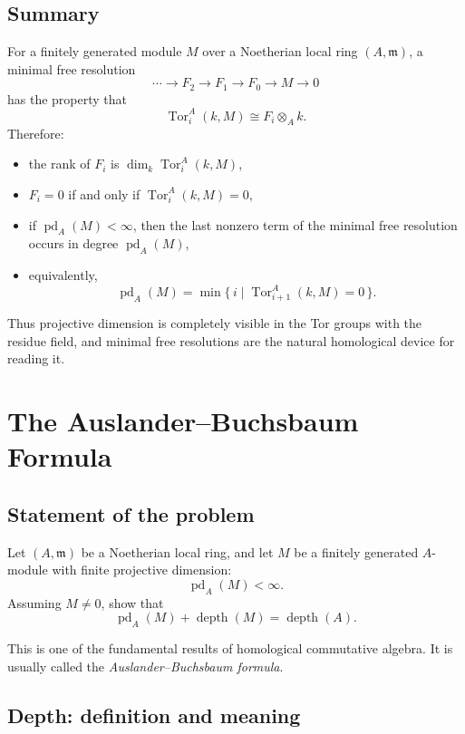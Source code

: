 \documentclass[12pt,a4paper]{article}
\theoremstyle{notespace}
\DeclareMathOperator{\Tor}{Tor}
\begin{document}
\subsection{Summary}

For a finitely generated module \(M\) over a Noetherian local ring \((A,\mathfrak m)\), a minimal free resolution
\[
\cdots \longrightarrow F_2 \longrightarrow F_1 \longrightarrow F_0 \longrightarrow M \longrightarrow 0
\]
has the property that
\[
\Tor_i^A(k,M)\cong F_i\otimes_A k.
\]
Therefore:
\begin{itemize}
	\item the rank of \(F_i\) is \(\dim_k \Tor_i^A(k,M)\),
	\item \(F_i=0\) if and only if \(\Tor_i^A(k,M)=0\),
	\item if \(\operatorname{pd}_A(M)<\infty\), then the last nonzero term of the minimal free resolution occurs in degree \(\operatorname{pd}_A(M)\),
	\item equivalently,
	\[
	\operatorname{pd}_A(M)
	=
	\min \bigl\{\, i \;\big|\; \Tor^A_{i+1}(k,M)=0 \,\bigr\}.
	\]
\end{itemize}

Thus projective dimension is completely visible in the Tor groups with the residue field, and minimal free resolutions are the natural homological device for reading it.


\section{The Auslander--Buchsbaum Formula}

\subsection{Statement of the problem}

Let \((A,\mathfrak m)\) be a Noetherian local ring, and let \(M\) be a finitely generated \(A\)-module with finite projective dimension:
\[
\operatorname{pd}_A(M)<\infty.
\]
Assuming \(M\neq 0\), show that
\[
\operatorname{pd}_A(M)+\operatorname{depth}(M)=\operatorname{depth}(A).
\]

This is one of the fundamental results of homological commutative algebra. It is usually called the \emph{Auslander--Buchsbaum formula}.

\subsection{Depth: definition and meaning}
\end{document}
